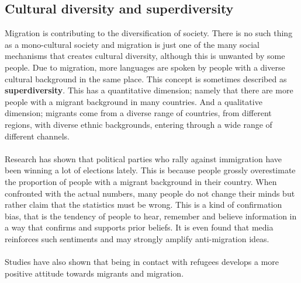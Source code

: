 \documentclass[../summary.tex]{subfiles}
\begin{document}
 	\subsection{Cultural diversity and superdiversity}
 	Migration is contributing to the diversification of society. There is no such thing as a mono-cultural society and migration is just one of the many social mechanisms that creates cultural diversity, although this is unwanted by some people. Due to migration, more languages are spoken by people with a diverse cultural background in the same place. This concept is sometimes described as \textbf{superdiversity}. This has a quantitative dimension; namely that there are more people with a migrant background in many countries. And a qualitative dimension; migrants come from a diverse range of countries, from different regions, with diverse ethnic backgrounds, entering through a wide range of different channels.
 	\\
 	\\
 	Research has shown that political parties who rally against immigration have been winning a lot of elections lately. This is because people grossly overestimate the proportion of people with a migrant background in their country. When confronted with the actual numbers, many people do not change their minds but rather claim that the statistics must be wrong. This is a kind of confirmation bias, that is the tendency of people to hear, remember and believe information in a way that confirms and supports prior beliefs. It is even found that media reinforces such sentiments and may strongly amplify anti-migration ideas.
 	\\
 	\\
 	Studies have also shown that being in contact with refugees develops a more positive attitude towards migrants and migration.
 	
\end{document}
